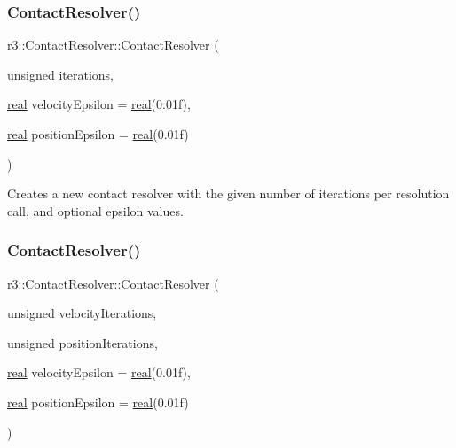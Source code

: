 \subsubsection{\texorpdfstring{Contact\+Resolver()}{ContactResolver()}\hspace{0.1cm}{\footnotesize\ttfamily [1/2]}}
{\footnotesize\ttfamily r3\+::\+Contact\+Resolver\+::\+Contact\+Resolver (\begin{DoxyParamCaption}\item[{unsigned}]{iterations,  }\item[{\mbox{\hyperlink{namespacer3_ab2016b3e3f743fb735afce242f0dc1eb}{real}}}]{velocity\+Epsilon = {\ttfamily \mbox{\hyperlink{namespacer3_ab2016b3e3f743fb735afce242f0dc1eb}{real}}(0.01f)},  }\item[{\mbox{\hyperlink{namespacer3_ab2016b3e3f743fb735afce242f0dc1eb}{real}}}]{position\+Epsilon = {\ttfamily \mbox{\hyperlink{namespacer3_ab2016b3e3f743fb735afce242f0dc1eb}{real}}(0.01f)} }\end{DoxyParamCaption})\hspace{0.3cm}{\ttfamily [explicit]}}

Creates a new contact resolver with the given number of iterations per resolution call, and optional epsilon values. \mbox{\label{classr3_1_1_contact_resolver_acb2f7f96722326346fbe0e54d05cfdc9}} 
\subsubsection{\texorpdfstring{Contact\+Resolver()}{ContactResolver()}\hspace{0.1cm}{\footnotesize\ttfamily [2/2]}}
{\footnotesize\ttfamily r3\+::\+Contact\+Resolver\+::\+Contact\+Resolver (\begin{DoxyParamCaption}\item[{unsigned}]{velocity\+Iterations,  }\item[{unsigned}]{position\+Iterations,  }\item[{\mbox{\hyperlink{namespacer3_ab2016b3e3f743fb735afce242f0dc1eb}{real}}}]{velocity\+Epsilon = {\ttfamily \mbox{\hyperlink{namespacer3_ab2016b3e3f743fb735afce242f0dc1eb}{real}}(0.01f)},  }\item[{\mbox{\hyperlink{namespacer3_ab2016b3e3f743fb735afce242f0dc1eb}{real}}}]{position\+Epsilon = {\ttfamily \mbox{\hyperlink{namespacer3_ab2016b3e3f743fb735afce242f0dc1eb}{real}}(0.01f)} }\end{DoxyParamCaption})}

